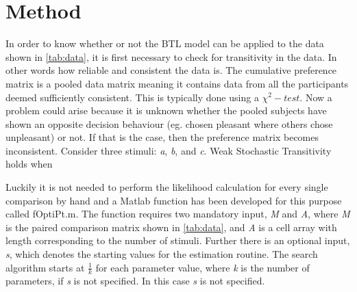 \section*{Method}
\label{Method}
%
In order to know whether or not the BTL model can be applied to the data shown in \autoref{tab:data}, it is first necessary to check for transitivity in the data. In other words how reliable and consistent the data is. The cumulative preference matrix is a pooled data matrix meaning it contains data from all the participants deemed sufficiently consistent. This is typically done using a $\chi^{2}-test$. Now a problem could arise because it is unknown whether the pooled subjects have shown an opposite decision behaviour (eg. chosen pleasant where others chose unpleasant) or not. If that is the case, then the preference matrix becomes inconsistent.
Consider three stimuli: \textit{a}, \textit{b}, and \textit{c}. Weak Stochastic Transitivity holds when 



Luckily it is not needed to perform the likelihood calculation for every single comparison by hand and a Matlab function has been developed for this purpose called fOptiPt.m. The function requires two mandatory input, \textit{M} and \textit{A}, where \textit{M} is the paired comparison matrix shown in \autoref{tab:data}, and \textit{A} is a cell array with length corresponding to the number of stimuli. Further there is an optional input, \textit{s}, which denotes the starting values for the estimation routine. The search algorithm starts at $\frac{1}{k}$ for each parameter value, where \textit{k} is the number of parameters, if \textit{s} is not specified. In this case \textit{s} is not specified.



